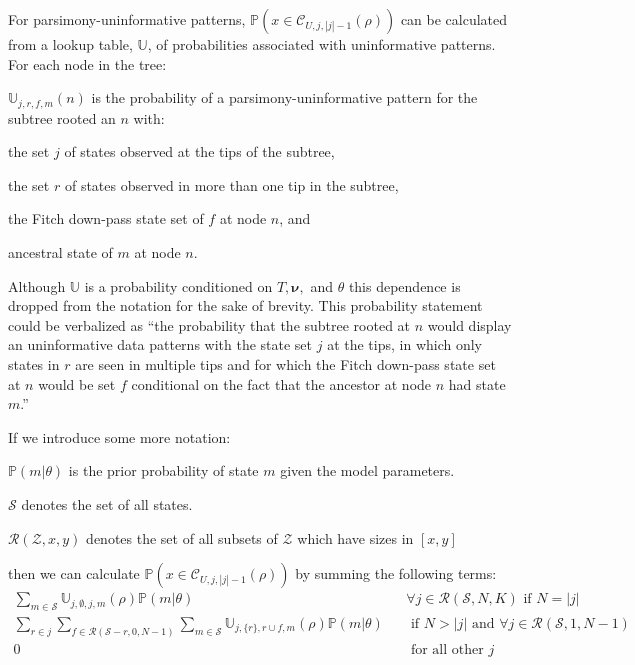 \documentclass[11pt]{article}
\newcommand{\treeRoot}{\ensuremath{\rho}\xspace}
\newcommand{\uninform}{\ensuremath{U}\xspace}
\newcommand{\numStates}{\ensuremath{K}\xspace}
\newcommand{\numLeavesTotal}{\ensuremath{N}\xspace}
\newcommand{\allStates}{\ensuremath{\mathcal S}\xspace}
\newcommand{\edgeLengths}{\ensuremath{\bm \nu}\xspace}
\newcommand{\patProbSym}{\ensuremath{\mathbb P}\xspace}
\renewcommand{\Pr}{\patProbSym}
\newcommand{\patClassSym}{\ensuremath{\mathcal C}\xspace}
\newcommand{\patClass}[3]{\ensuremath{\patClassSym_{#1,#2,#3}}\xspace}
\newcommand{\probUninformPatClassSym}{\ensuremath{\mathbb U}\xspace}
\newcommand{\probUninformPatClass}[5]{\ensuremath{\probUninformPatClassSym_{#1,#2,#3,#4}\left(#5\right)}\xspace}
\newcommand{\subsetsOfSizeSet}[3]{\ensuremath{\mathcal R}\left(#1,#2,#3\right)\xspace}
\begin{document}
For parsimony-uninformative patterns, $\Pr(x\in\patClass{\uninform}{j}{|j|-1}(\treeRoot))$ can be calculated from a lookup table, $\probUninformPatClassSym$, of probabilities associated with uninformative patterns.
For each node in the tree:
\begin{compactitem}
	\item $\probUninformPatClass{j}{r}{f}{m}{n}$ is the probability of a parsimony-uninformative pattern for the subtree rooted an $n$ with:
		\begin{compactitem}
			\item the set $j$ of states observed at the tips of the subtree,
			\item the set $r$ of states observed in more than one tip in the subtree,
			\item the Fitch down-pass state set of $f$ at node $n$, and
			\item ancestral state of $m$ at node $n$.
		\end{compactitem}
		Although \probUninformPatClassSym is a probability conditioned on $T, \edgeLengths,$ and $\theta$ this dependence is dropped from the notation for the sake of brevity.
		This probability statement could be verbalized as ``the probability that the subtree rooted at $n$ would display an uninformative data patterns with the state set $j$ at the tips, in which only states in $r$ are seen in multiple tips and for which the Fitch down-pass state set at $n$ would be set $f$ conditional on the fact that the ancestor at node $n$ had state $m$.''
\end{compactitem}
If we introduce some more notation:
\begin{compactitem}
	\item $\Pr(m|\theta)$ is the prior probability of state $m$ given the model parameters.
	\item \allStates denotes the set of all states.
	\item $\subsetsOfSizeSet{\mathcal{Z}}{x}{y}$ denotes the set of all subsets of ${\mathcal Z}$ which have sizes in $[x,y]$
\end{compactitem}
then we can calculate $\Pr(x\in\patClass{\uninform}{j}{|j|-1}(\treeRoot))$ by summing the following terms:
\begin{eqnarray}
   \sum_{m\in\allStates}\probUninformPatClass{j}{\emptyset}{j}{m}{\treeRoot}\Pr(m|\theta) && 	\forall j \in  \subsetsOfSizeSet{\allStates}{\numLeavesTotal}{\numStates} \mbox{ if } N = |j|  \label{noRepeatedStates}\\
  \sum_{r\in j}\sum_{f\in\subsetsOfSizeSet{\allStates-r}{0}{\numLeavesTotal-1}}\sum_{m\in\allStates}\probUninformPatClass{j}{\{r\}}{r\cup f}{m}{\treeRoot}\Pr(m|\theta)  &&  \mbox{ if } N > |j| \mbox{ and }\forall j \in  \subsetsOfSizeSet{\allStates}{1}{\numLeavesTotal-1}\label{oneRepeatedState}\\
  0 && \mbox{ for all other } j \mbox{}
\end{eqnarray}
\end{document}
